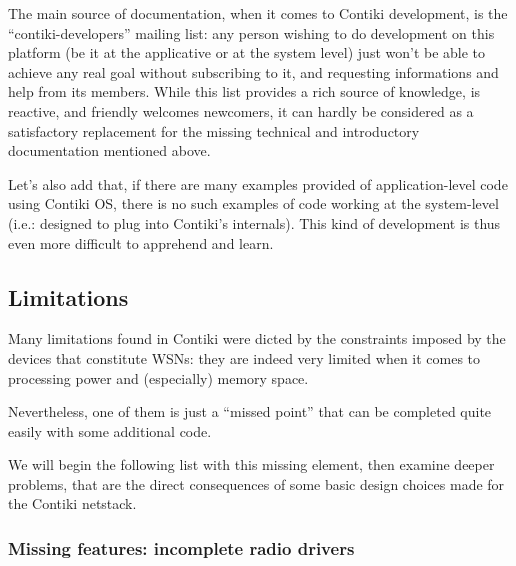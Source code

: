 \documentclass[12pt,twoside,a4paper]{article}
\begin{document}
The main source of documentation, when it comes to Contiki development,
is the ``contiki-developers'' mailing list\footnotemark[3]: any person
wishing to do development on this platform (be it at the applicative or at
the system level) just won't be able to achieve any real goal without
subscribing to it, and requesting informations and help from its members.
While this list provides a rich source of knowledge, is reactive, and
friendly welcomes newcomers, it can hardly be considered as a satisfactory
replacement for the missing technical and introductory documentation
mentioned above.


Let's also add that, if there are many examples provided of application-level
code using Contiki OS, there is no such examples of code working at the
system-level (i.e.: designed to plug into Contiki's internals). This kind
of development is thus even more difficult to apprehend and learn.


\subsection{Limitations}

Many limitations found in Contiki were dicted by the constraints imposed
by the devices that constitute WSNs: they are indeed very limited when
it comes to processing power and (especially) memory space.

Nevertheless, one of them is just a ``missed point'' that can be completed
quite easily with some additional code.

We will begin the following list with this missing element, then examine
deeper problems, that are the direct consequences of some basic design
choices made for the Contiki netstack.


\subsubsection{Missing features: incomplete radio drivers}
\end{document}
